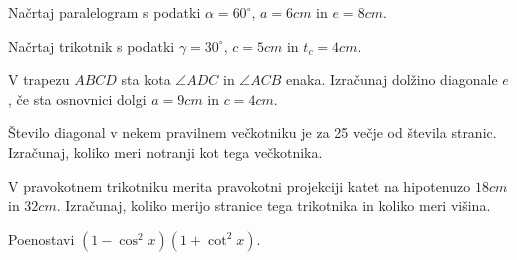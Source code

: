 \documentclass{izpit}
\begin{document}
\naloga[\tocke{5}]
  Načrtaj paralelogram s podatki $\alpha=60^\circ$, $a=6cm$ in $e=8cm$.



\naloga[\tocke{5}]
  Načrtaj trikotnik s podatki $\gamma =30^\circ$, $c=5cm$ in $t_c =4cm$.


  
\naloga[5]
  V trapezu $ABCD$ sta kota $\angle ADC$ in $\angle ACB$ enaka. Izračunaj dolžino diagonale $e$, če sta osnovnici dolgi $a=9cm$ in $c=4cm$.
  \prostor[2]

\naloga*[4]
  Število diagonal v nekem pravilnem večkotniku je za 25 večje od števila stranic. Izračunaj, koliko meri notranji kot tega večkotnika.
  \prostor[1]


\naloga[\tocke{4}]
  V pravokotnem trikotniku merita pravokotni projekciji katet na hipotenuzo $18cm$ in $32cm$. Izračunaj, koliko merijo stranice tega trikotnika in koliko meri višina.
  \prostor[1]

\naloga*[\tocke{4}]
  Poenostavi $\left(1-\cos^2 x\right)(1+\cot^2 x)$.
  \prostor[1]
\end{document}
